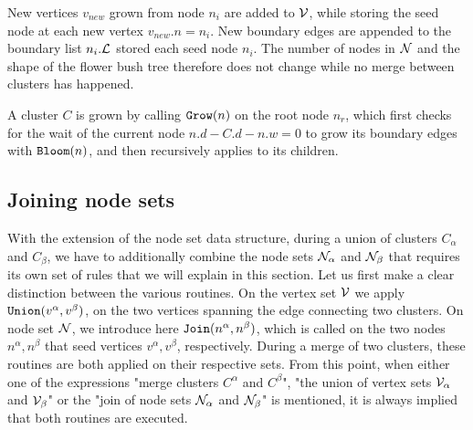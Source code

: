 New vertices $v_{new}$ grown from node $n_i$ are added to $\mathcal{V}$, while storing the seed node at each new vertex $v_{new}.n = n_i$. New boundary edges are appended to the boundary list $n_i.\mathcal{L}$ stored each seed node $n_i$. The number of nodes in $\mathcal{N}$ and the shape of the flower bush tree therefore does not change while no merge between clusters has happened.

\begin{theorem}\label{the:grownode}
  A cluster $C$ is grown by calling $\texttt{Grow}(n)$ on the root node $n_r$, which first checks for the wait of the current node $ n.d - C.d - n.w = 0$ to grow its boundary edges with $\texttt{Bloom}(n)$, and then recursively applies  to its children.
\end{theorem}

\begin{algo}[algotitle=Grow, label=al:bbgrow]
\begin{algorithm}[H]


\KwData{\node}

\BlankLine


\end{algorithm}
\end{algo}


\subsection{Joining node sets}\label{sec:jointnodesets}
With the extension of the node set data structure, during a union of clusters $C_\alpha$ and $C_\beta$, we have to additionally combine the node sets $\mathcal{N}_{\alpha}$ and $\mathcal{N}_\beta$ that requires its own set of rules that we will explain in this section. Let us first make a clear distinction between the various routines. On the vertex set $\mathcal{V}$ we apply $\texttt{Union}(v^\alpha, v^\beta)$, on the two vertices spanning the edge connecting two clusters. On node set $\mathcal{N}$, we introduce here $\texttt{Join}(n^\alpha, n^\beta)$, which is called on the two nodes $n^\alpha, n^\beta$ that seed vertices $v^\alpha, v^\beta$, respectively. During a merge of two clusters, these routines are both applied on their respective sets. From this point, when either one of the expressions "merge clusters $C^\alpha$ and $C^\beta$", "the union of vertex sets $\mathcal{V}_\alpha$ and $\mathcal{V}_\beta$" or the "join of node sets $\mathcal{N}_{\alpha}$ and $\mathcal{N}_\beta$" is mentioned, it is always implied that both routines are executed.

